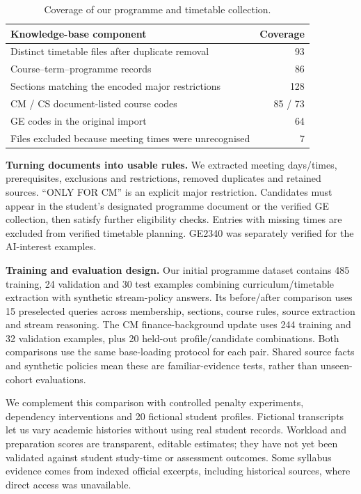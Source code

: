 \documentclass{article}
\begin{document}
\begin{table}[H]
\centering\small
\caption{Coverage of our programme and timetable collection.}
\begin{tabular}{p{3.85in}r}
\toprule
Knowledge-base component & Coverage\\
\midrule
Distinct timetable files after duplicate removal & 93\\
Course--term--programme records & 86\\
Sections matching the encoded major restrictions & 128\\
CM / CS document-listed course codes & 85 / 73\\
GE codes in the original import & 64\\
Files excluded because meeting times were unrecognised & 7\\
\bottomrule
\end{tabular}
\label{tab:data}
\end{table}

\textbf{Turning documents into usable rules.} We extracted meeting days/times, prerequisites, exclusions and restrictions, removed duplicates and retained sources. ``ONLY FOR CM'' is an explicit major restriction. Candidates must appear in the student's designated programme document or the verified GE collection, then satisfy further eligibility checks. Entries with missing times are excluded from verified timetable planning. GE2340 was separately verified for the AI-interest examples.

\newpage
\textbf{Training and evaluation design.} Our initial programme dataset contains 485 training, 24 validation and 30 test examples combining curriculum/timetable extraction with synthetic stream-policy answers. Its before/after comparison uses 15 preselected queries across membership, sections, course rules, source extraction and stream reasoning. The CM finance-background update uses 244 training and 32 validation examples, plus 20 held-out profile/candidate combinations. Both comparisons use the same base-loading protocol for each pair. Shared source facts and synthetic policies mean these are familiar-evidence tests, rather than unseen-cohort evaluations.

We complement this comparison with controlled penalty experiments, dependency interventions and 20 fictional student profiles. Fictional transcripts let us vary academic histories without using real student records. Workload and preparation scores are transparent, editable estimates; they have not yet been validated against student study-time or assessment outcomes. Some syllabus evidence comes from indexed official excerpts, including historical sources, where direct access was unavailable.
\end{document}
